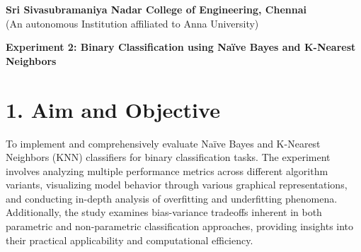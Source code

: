 \documentclass[11pt]{article}
\begin{document}
\begin{center}
    \large \textbf{Sri Sivasubramaniya Nadar College of Engineering, Chennai} \\
    (An autonomous Institution affiliated to Anna University) \\
    \vspace{0.3cm}
\end{center}

\begin{table}[!h]
\renewcommand{\arraystretch}{1.5}
\end{table}

\begin{center}
\textbf{Experiment 2: Binary Classification using Na\"ive Bayes and K-Nearest Neighbors}
\end{center}

\section*{1. Aim and Objective}
To implement and comprehensively evaluate Na\"ive Bayes and K-Nearest Neighbors (KNN) classifiers for binary classification tasks. The experiment involves analyzing multiple performance metrics across different algorithm variants, visualizing model behavior through various graphical representations, and conducting in-depth analysis of overfitting and underfitting phenomena. Additionally, the study examines bias-variance tradeoffs inherent in both parametric and non-parametric classification approaches, providing insights into their practical applicability and computational efficiency.

\end{document}
